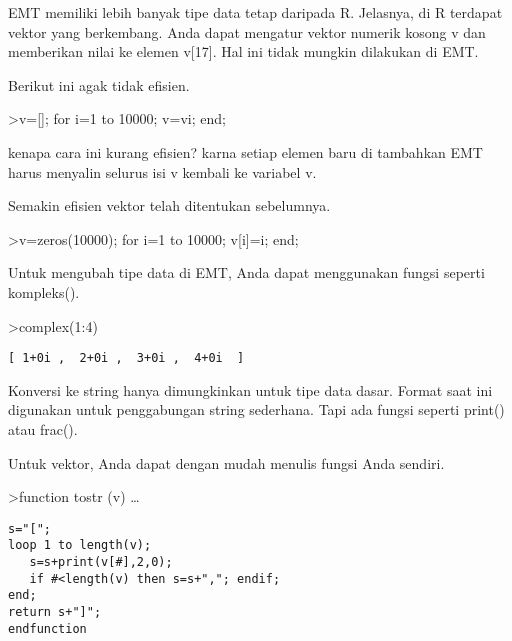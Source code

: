 \documentclass[
]{book}
\begin{document}
EMT memiliki lebih banyak tipe data tetap daripada R. Jelasnya, di R terdapat vektor yang berkembang. Anda dapat mengatur vektor numerik kosong v dan memberikan nilai ke elemen v{[}17{]}. Hal ini tidak mungkin dilakukan di EMT.

Berikut ini agak tidak efisien.

\textgreater v={[}{]}; for i=1 to 10000; v=v\textbar i; end;

kenapa cara ini kurang efisien? karna setiap elemen baru di tambahkan EMT harus menyalin selurus isi v kembali ke variabel v.

Semakin efisien vektor telah ditentukan sebelumnya.

\textgreater v=zeros(10000); for i=1 to 10000; v{[}i{]}=i; end;

Untuk mengubah tipe data di EMT, Anda dapat menggunakan fungsi seperti kompleks().

\textgreater complex(1:4)

\begin{verbatim}
[ 1+0i ,  2+0i ,  3+0i ,  4+0i  ]
\end{verbatim}

Konversi ke string hanya dimungkinkan untuk tipe data dasar. Format saat ini digunakan untuk penggabungan string sederhana. Tapi ada fungsi seperti print() atau frac().

Untuk vektor, Anda dapat dengan mudah menulis fungsi Anda sendiri.

\textgreater function tostr (v) \ldots{}

\begin{verbatim}
s="[";
loop 1 to length(v);
   s=s+print(v[#],2,0);
   if #<length(v) then s=s+","; endif;
end;
return s+"]";
endfunction
\end{verbatim}
\end{document}
